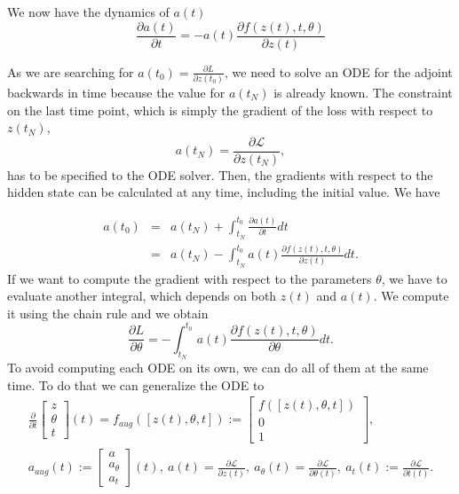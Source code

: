 \documentclass[10pt,a4paper]{article}
\theoremstyle{definition}
\theoremstyle{plain}
\begin{document}
We now have the dynamics of $a(t)$
\begin{equation}
\label{dynat}
\frac{\partial a(t)}{\partial t} = -a(t)\frac{\partial f(z(t),t,\theta)} {\partial z(t)}
\end{equation}
 
As we are searching for $ a(t_0) = \frac{\partial L}{\partial z(t_0)}$, we need to solve an ODE for the adjoint backwards in time because the value for $a(t_N)$ is already known. The constraint on the last time point, which is simply the gradient of the loss with respect to $z(t_N)$, 
\begin{equation*}
a(t_N) = \frac{\partial \mathcal{L}}{\partial z(t_N)},
\end{equation*}
has to be specified to the ODE solver. Then, the gradients with respect to the hidden state can be calculated at any time, including the initial value. We have 

\begin{eqnarray*}
a(t_0) &=& a(t_N) + \int^{t_0}_{t_N} \frac{\partial a(t)}{\partial t} dt\\
	   &=& a(t_N) - \int^{t_0}_{t_N} a(t) \frac{\partial f(z(t),t,\theta)} {\partial z(t)} dt.
\end{eqnarray*}
If we want to compute the gradient with respect to the parameters $\theta$, we have to evaluate another integral, which depends on both $z(t)$ and $a(t)$. We compute it using the chain rule and we obtain
\begin{equation}
\label{devtheta}
\frac{\partial L}{\partial \theta} = - \int^{t_0}_{t_N} a(t) \frac{\partial f(z(t),t,\theta)} {\partial \theta} dt.
\end{equation}
To avoid computing each ODE on its own, we can do all of them at the same time. To do that we can generalize the ODE to
\begin{eqnarray*}
\frac{\partial}{\partial t} \begin{bmatrix}
							z \\ \theta \\ t
							\end{bmatrix} (t) 
= f_{aug}([z(t),\theta ,t]) := \begin{bmatrix}
							f([z(t),\theta ,t]) \\ 0 \\ 1
							\end{bmatrix}, \\
a_{aug} (t) := \begin{bmatrix}
			a \\ a_{\theta} \\ a_t
			\end{bmatrix} (t) , \ 
a(t) = \frac{\partial \mathcal{L}}{\partial z(t)}, \ 
a_\theta (t) = \frac{\partial \mathcal{L}}{\partial \theta (t)}, \ 
a_t(t) := \frac{\partial \mathcal{L}}{\partial t(t)}.
\end{eqnarray*}
\end{document}

